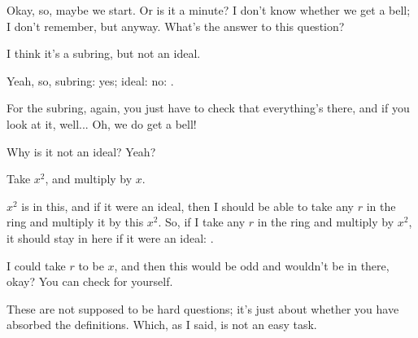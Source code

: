\begin{speech}[00:45:05 - 00:45:20]
Okay, so, maybe we start. Or is it a minute? I don't know whether we get a bell; I don't remember, but anyway. What's the answer to this question?
\end{speech}

\begin{student}
I think it's a subring, but not an ideal.
\end{student}

\begin{speech}[00:45:24 - 00:45:44]
Yeah, so, subring: yes; ideal: no: .

For the subring, again, you just have to check that everything's there, and if you look at it, well... Oh, we do get a bell! 

Why is it not an ideal? Yeah?
\end{speech}

\begin{student}
Take $x^2$, and multiply by $x$.
\end{student}

\begin{speech}[00:45:48 - 00:46:21]
$x^2$ is in this,  and if it were an ideal, then I should be able to take any $r$ in the ring and multiply it by this $x^2$. So, if I take any $r$ in the ring and multiply by $x^2$, it should stay in here if it were an ideal: .

I could take $r$ to be $x$,  and then this would be odd and wouldn't be in there, okay?  You can check for yourself.

These are not supposed to be hard questions; it's just about whether you have absorbed the definitions. Which, as I said, is not an easy task.
\end{speech}

